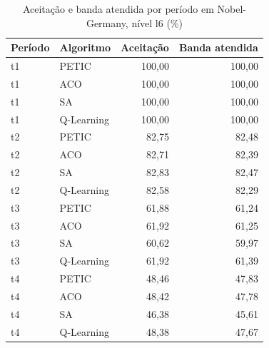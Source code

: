 \begin{table}[htb]
    \centering
    \scriptsize
    \caption{Aceitação e banda atendida por período em Nobel-Germany, nível l6 (\%)}
    \label{tab:periodos-nobel-germany-l6}
    \begin{tabular}{llrr}
        \hline
        Período & Algoritmo & Aceitação & Banda atendida \\
        \hline
        t1 & PETIC & 100,00 & 100,00 \\
        t1 & ACO & 100,00 & 100,00 \\
        t1 & SA & 100,00 & 100,00 \\
        t1 & Q-Learning & 100,00 & 100,00 \\
        t2 & PETIC & 82,75 & 82,48 \\
        t2 & ACO & 82,71 & 82,39 \\
        t2 & SA & 82,83 & 82,47 \\
        t2 & Q-Learning & 82,58 & 82,29 \\
        t3 & PETIC & 61,88 & 61,24 \\
        t3 & ACO & 61,92 & 61,25 \\
        t3 & SA & 60,62 & 59,97 \\
        t3 & Q-Learning & 61,92 & 61,39 \\
        t4 & PETIC & 48,46 & 47,83 \\
        t4 & ACO & 48,42 & 47,78 \\
        t4 & SA & 46,38 & 45,61 \\
        t4 & Q-Learning & 48,38 & 47,67 \\
        \hline
    \end{tabular}
\end{table}

